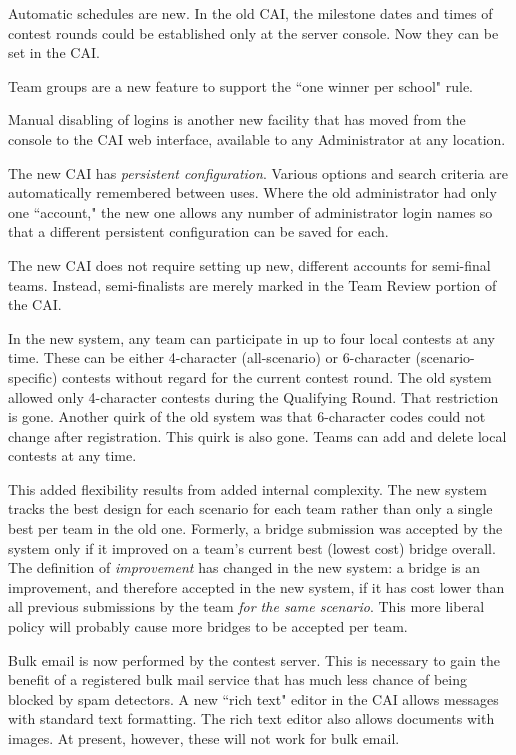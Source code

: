 \documentclass[11pt,letterpaper]{refart}
\begin{document}
Automatic schedules are new. In the old CAI, the milestone dates and times of contest 
rounds could be established only at the server console. Now they can be 
set in the CAI. 

Team groups are a new feature to support the 
``one winner per school" rule. 

Manual disabling of logins is another new facility that
has moved from the console to the CAI web interface, available to any Administrator
at any location.

The new CAI has \emph{persistent configuration}. Various options and
search criteria are automatically remembered between uses. Where the
old administrator had only one ``account," the new one allows any number
of administrator login names so that a different persistent configuration
can be saved for each.

The new CAI does not require setting up new, different accounts for semi-final teams. 
Instead, semi-finalists are merely marked in the Team Review portion of the CAI. 

In the new system, any team can participate in up to four local contests at any time.
These can be either 
4-character (all-scenario) or 6-character (scenario-specific) contests without regard for the 
current contest round. The old system allowed only 4-character contests 
during the Qualifying Round. That restriction is gone. Another quirk of the 
old system was that 6-character codes could not change after registration. This quirk is 
also gone. Teams can add and delete local contests at any time. 

This added flexibility results from added internal complexity. The new system tracks the  
best  design for each scenario for each team rather than only a single best per team in 
the old one. Formerly, a bridge submission was accepted by the system only if 
it improved on a team's current best (lowest cost) bridge overall. The definition of 
\emph{improvement} has changed in the new system: a bridge is an improvement, and 
therefore accepted in the new system, if it has cost
lower than all previous submissions by the team \emph{for the same scenario}. This
more liberal policy will probably cause more bridges to be accepted per team. 

Bulk email is now performed by the contest server. This is necessary to gain the benefit of
a registered bulk mail service that has much less chance of being blocked by spam detectors.
A new ``rich text" editor in the CAI allows messages with standard text formatting.
The rich text editor also allows documents with images. At present, however, these will
not work for bulk email.
\end{document}
